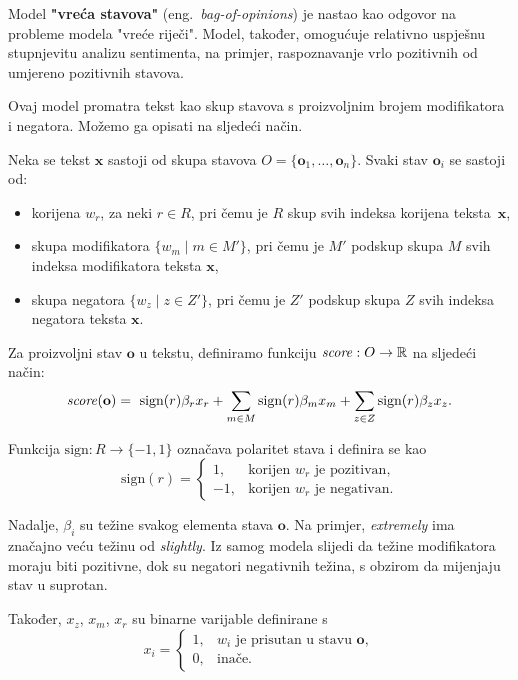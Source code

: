 \documentclass[a4paper,twoside,12pt]{memoir} %
\newcommand{\ti}[1]{\textit{#1\/}}
\newcommand{\tb}{\textbf}
\begin{document}
	Model \tb{"vreća stavova"} (eng.~\ti{bag-of-opinions}) je nastao kao odgovor na probleme modela "vreće riječi". Model, također, omogućuje relativno uspješnu stupnjevitu analizu sentimenta, na primjer, raspoznavanje vrlo pozitivnih od umjereno pozitivnih stavova.

	Ovaj model promatra tekst kao skup stavova s proizvoljnim brojem modifikatora i negatora. Možemo ga opisati na sljedeći način.

	Neka se tekst $\mathbf{x}$ sastoji od skupa stavova $O = \{ \mathbf{o}_1, \ldots, \mathbf{o}_n \}$. Svaki stav $\mathbf{o}_i$ se sastoji od:
	\begin{itemize}
		\item	korijena $w_r$, za neki $r \in R$, pri čemu je $R$ skup svih indeksa korijena teksta~$\mathbf{x}$,
		\item 	skupa modifikatora $\{w_m \mid m \in M'\}$, pri čemu je $M'$ podskup skupa $M$ svih indeksa modifikatora teksta $\mathbf{x}$,
		\item 	skupa negatora $\{w_z \mid z \in Z'\}$, pri čemu je $Z'$ podskup skupa $Z$ svih indeksa negatora teksta $\mathbf{x}$.
	\end{itemize}

	Za proizvoljni stav $\mathbf{o}$ u tekstu, definiramo funkciju $\ti{score} : O \to \mathbb{R}$ na sljedeći način:
	\begin{equation*}
	\ti{score} (\mathbf{o}) = \text{ sign} (r) \beta_r x_r
	+ \sum_{m \in M}\text{sign}(r) \beta_m x_m
	+ \sum_{z \in Z}\text{sign}(r) \beta_z x_z.
	\end{equation*}

	Funkcija $\text{sign} : R \to \{-1, 1\}$ označava polaritet stava i definira se kao
	\begin{equation*}
	\text{sign}(r) =
	\begin{cases}
	1, 	& \text{korijen } w_r \text{ je pozitivan}, \\
	-1,     & \text{korijen } w_r \text{ je negativan}.
	\end{cases}
	\end{equation*}

	Nadalje, $\beta_i$ su težine svakog elementa stava $\mathbf{o}$. Na primjer, \ti{extremely} ima značajno veću težinu od \ti{slightly}. Iz samog modela slijedi da težine modifikatora moraju biti pozitivne, dok su negatori negativnih težina, s obzirom da mijenjaju stav u suprotan.

	Također, $x_z$, $x_m$, $x_r$ su binarne varijable definirane s
	\begin{equation*}
	x_i =
	\begin{cases}
	1, 	& w_i \text{ je prisutan u stavu } \mathbf{o}, \\
	0,      & \text{inače}.
	\end{cases}
	\end{equation*}
\end{document}
